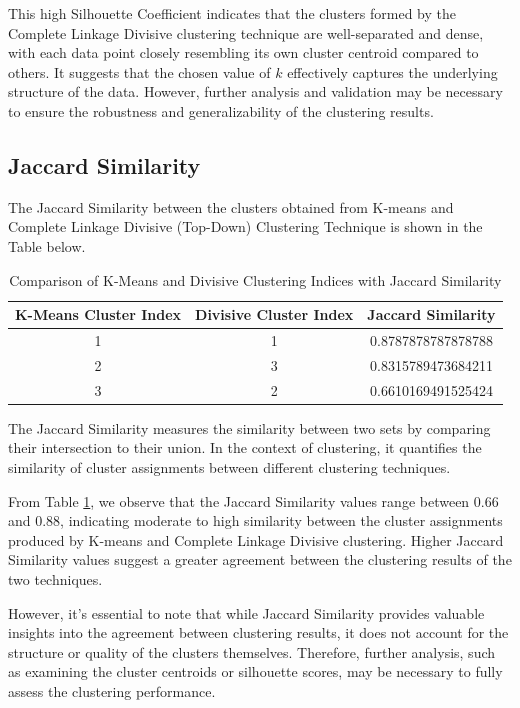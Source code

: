 \documentclass[12pt]{article}
\begin{document}
	This high Silhouette Coefficient indicates that the clusters formed by the Complete Linkage Divisive clustering technique are well-separated and dense, with each data point closely resembling its own cluster centroid compared to others. It suggests that the chosen value of \( k \) effectively captures the underlying structure of the data. However, further analysis and validation may be necessary to ensure the robustness and generalizability of the clustering results.
	
	\subsection{Jaccard Similarity}
	The Jaccard Similarity between the clusters obtained from K-means and Complete Linkage Divisive (Top-Down) Clustering Technique is shown in the Table below.
	
	\begin{table}[htbp]
		\centering
		\begin{tabular}{ccc}
			\toprule
			\textbf{K-Means Cluster Index} & \textbf{Divisive Cluster Index} & \textbf{Jaccard Similarity} \\
			\midrule
			1 & 1 & 0.8787878787878788 \\
			2 & 3 & 0.8315789473684211 \\
			3 & 2 & 0.6610169491525424 \\
			\bottomrule
		\end{tabular}
		\caption{Comparison of K-Means and Divisive Clustering Indices with Jaccard Similarity}
		\label{tab:cluster_comparison}
	\end{table}
	
	The Jaccard Similarity measures the similarity between two sets by comparing their intersection to their union. In the context of clustering, it quantifies the similarity of cluster assignments between different clustering techniques. 
	
	From Table \ref{tab:cluster_comparison}, we observe that the Jaccard Similarity values range between 0.66 and 0.88, indicating moderate to high similarity between the cluster assignments produced by K-means and Complete Linkage Divisive clustering. Higher Jaccard Similarity values suggest a greater agreement between the clustering results of the two techniques.
	
	However, it's essential to note that while Jaccard Similarity provides valuable insights into the agreement between clustering results, it does not account for the structure or quality of the clusters themselves. Therefore, further analysis, such as examining the cluster centroids or silhouette scores, may be necessary to fully assess the clustering performance.
\end{document}
